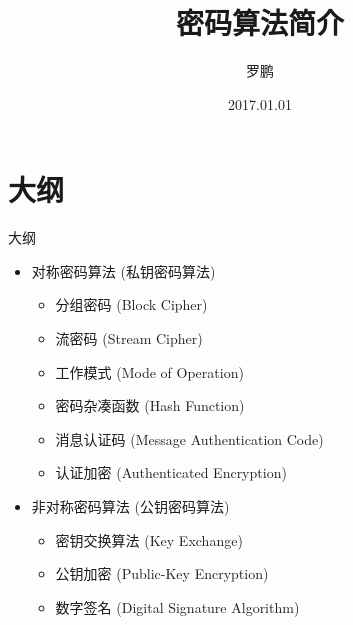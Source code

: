 \documentclass[xcolor=svgnames,handout]{beamer}
\title
  []%
  {密码算法简介}
\author
  [罗鹏]
  {罗鹏}
\date
  {2017.01.01}
\institute
  {中国科学院信息工程研究所}
\begin{document}
\maketitle

\section{大纲}
\begin{frame}
  {大纲}
  \begin{itemize}
    \item 对称密码算法 (私钥密码算法)
	    \begin{itemize}
	 	\item 分组密码 (Block Cipher)
		\item 流密码 (Stream Cipher)
		\item 工作模式 (Mode of Operation)
		\item 密码杂凑函数 (Hash Function)
		\item 消息认证码 (Message Authentication Code)
		\item 认证加密 (Authenticated Encryption)
	    \end{itemize}
    \item 非对称密码算法 (公钥密码算法)
	    \begin{itemize}
	 	\item 密钥交换算法 (Key Exchange)
		\item 公钥加密 (Public-Key Encryption)
		\item 数字签名 (Digital Signature Algorithm)
    \end{itemize}
  \end{itemize}
\end{frame}
\end{document}

